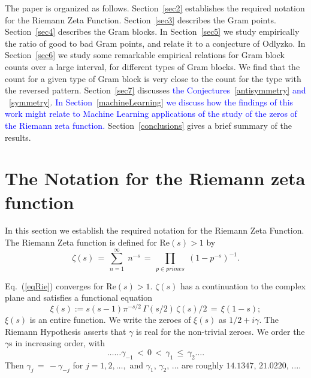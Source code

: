 \documentclass[twoside]{article}
\theoremstyle{definition}
\begin{document}
The paper is organized as follows.
Section~\ref{sec2} establishes the required notation for the 
Riemann Zeta Function. 
Section~\ref{sec3} describes the Gram points. 
Section~\ref{sec4} describes the Gram blocks. 
In Section~\ref{sec5} we study empirically the ratio of good to bad Gram points, and relate it to a conjecture of Odlyzko. 
In Section~\ref{sec6} we study some remarkable empirical relations for Gram block counts over a large interval, for different types of Gram blocks. We find that the count for
a given type of Gram block is very close to the count for the type with the reversed pattern. 
Section~\ref{sec7} discusses  \textcolor{blue}{the Conjectures~\ref{antisymmetry} and ~\ref{symmetry}}. 
 \textcolor{blue}{In Section~\ref{machineLearning} we discuss how the findings of this work might relate to Machine Learning applications of the study of the zeros of the Riemann zeta function.}
Section~\ref{conclusions} gives a brief summary of the results. 

\section{\label{sec2}The Notation for the Riemann zeta function }

In this section we  establish the required notation for the 
Riemann Zeta Function. 
The Riemann Zeta function is defined for $\mathrm{Re} (s) > 1$ by
\begin{equation}
\zeta ( s ) \, = \, \sum^{\infty}_{n = 1} \; n^{-s} \, = \, \prod_{p \in primes} \;
\left( 1 - p^{-s} \right)^{-1}.
\label{eqRie}
\end{equation}

Eq.~(\ref{eqRie})  converges for $\mathrm{Re} (s) > 1$.  
 $\zeta ( s )$ has a  continuation
to the complex plane and satisfies a functional equation \cite{Riemann(1858),Riemann 1892, Titchmarsh 1986,Edwards(1974)}
\begin{equation}  
\xi(s):=s(s-1) \pi^{-s/2} \, \Gamma (s/2) \, \zeta ( s )/2 \, = \, \xi ( 1 - s );
\label{eq:xifunc}
\end{equation}
$\xi(s)$ is an entire function. We
write the zeroes of $\xi(s)$ as $1/2 + i \gamma$. The Riemann Hypothesis  
asserts that $\gamma$ is real for the non-trivial zeroes.
We order the $\gamma$s in increasing order, with 
\begin{equation}
\ldots \ldots \gamma_{-1} \, < \, 0 \, < \, 
\gamma_1 \, \leq \, \gamma_2 \ldots. 
\end{equation}
Then $\gamma_j \, = \, - \gamma_{-j}$ for $j = 1, 2, \ldots,$ 
and    $\gamma_1$, $\gamma_2$, $\ldots$  are roughly
$14.1347$, $21.0220$, $\ldots$.
\end{document}
